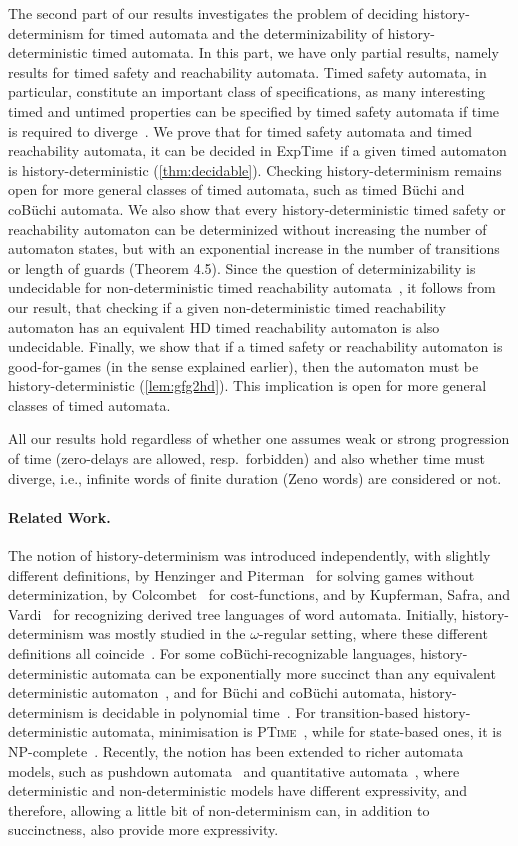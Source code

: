 \documentclass[10pt,a4paper]{amsart}
\theoremstyle{definition}
\numberwithin{equation}{section}
\newcommand{\exptime}{\EXPTIME}
\newcommand{\ptime}{\textsc{PTime}}
\newcommand{\NP}{\textsc{NP}}
\newcommand{\EXPTIME}{{\sc ExpTime}}
\newcommand{\mypar}[1]{\paragraph*{#1.}}
\begin{document}
The second part of our results investigates the problem of deciding
history-determinism for timed automata and the determinizability of
history-deterministic timed automata.
In this part, we have only partial results,
namely results for timed safety and reachability automata.
Timed safety automata, in particular, constitute an important class of
specifications, as many interesting timed and untimed properties
can be specified by timed safety automata if time is required to
diverge~\cite{HNSY1992,HKW95}.
We prove that for timed safety automata and timed reachability automata,
it can be decided in \exptime\ if a given timed automaton is
history-deterministic (\cref{thm:decidable}).
Checking history-determinism remains open for more general classes of
timed automata, such as timed B\"uchi and coB\"uchi automata.
We also show that every history-deterministic timed safety or reachability automaton can be determinized without increasing the number of automaton states, but with an exponential
increase in the number of transitions or length of guards (Theorem 4.5).
Since the question of determinizability is undecidable for non-deterministic
timed reachability automata~\cite{F06},
it follows from our result, that checking if a given
non-deterministic timed reachability automaton has an equivalent HD timed reachability automaton
is also undecidable.
Finally, we show that if a timed safety or reachability automaton is
good-for-games (in the sense explained earlier),
then the automaton must be history-deterministic (\cref{lem:gfg2hd}).
This implication is open for more general classes of timed automata.


All our results hold regardless of whether one assumes weak or strong progression of time (zero-delays are allowed, resp.~forbidden) and also whether time must diverge, i.e., infinite words of finite duration (Zeno words) are considered or not.



\medskip
\mypar{Related Work}
The notion of history-determinism was introduced independently, with slightly
different definitions, by Henzinger and Piterman~\cite{HP06} for solving games without determinization, by Colcombet~\cite{Col09} for  cost-functions, and by Kupferman, Safra, and Vardi~\cite{KSV06} for recognizing derived tree languages of word automata.
Initially, history-determinism was mostly studied in the $\omega$-regular setting,
where these different definitions all coincide~\cite{BL19}.
For some coB\"uchi-recognizable languages, history-deterministic automata can be
exponentially more succinct than any equivalent deterministic automaton~\cite{KS15},
and for B\"uchi and coB\"uchi automata, history-determinism is decidable in
polynomial time~\cite{BK18,KS15}.
For transition-based history-deterministic automata, minimisation is
\ptime~\cite{RK19}, while for state-based ones, it is \NP-complete~\cite{Sch20}.
Recently, the notion has been extended to richer automata models, such as
pushdown automata~\cite{LZ22,GJLZ21} and quantitative automata~\cite{BL21,BL22},
where deterministic and non-deterministic models have different expressivity,
and therefore, allowing a little bit of non-determinism can, in addition to
succinctness, also provide more expressivity.
\end{document}
